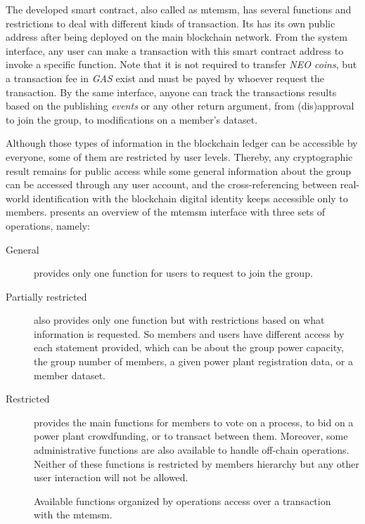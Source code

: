 The developed smart contract, also called as \gls{mtemsm}, has several functions and restrictions to deal with different kinds of transaction.
Its has its own public address after being deployed on the main blockchain network.
From the system interface, any user can make a transaction with this smart contract address to invoke a specific function.
Note that it is not required to transfer \emph{NEO coins}, but a transaction fee in \emph{GAS} exist and must be payed by whoever request the transaction.
By the same interface, anyone can track the transactions results based on the publishing \emph{events} or any other return argument, from (dis)approval to join the group, to modifications on a member's dataset.

Although those types of information in the blockchain ledger can be accessible by everyone, some of them are restricted by user levels.
Thereby, any cryptographic result remains for public access while some general information about the group can be accessed through any user account, and the cross-referencing between real-world identification with the blockchain digital identity keeps accessible only to members.
 presents an overview of the \gls{mtemsm} interface with three sets of operations, namely:
\begin{description} %
    \item[General] provides only one function for users to request to join the group.
    
    \item[Partially restricted] also provides only one function but with restrictions based on what information is requested. So members and users have different access by each statement provided, which can be about the group power capacity, the group number of members, a given power plant registration data, or a member dataset.
    
    \item[Restricted] provides the main functions for members to vote on a process, to bid on a power plant crowdfunding, or to transact between them. Moreover, some administrative functions are also available to handle off-chain operations. Neither of these functions is restricted by members hierarchy but any other user interaction will not be allowed.
\end{description}

\begin{figure}[h!tbp]{\textwidth}
    \centering
    \caption{Available functions organized by operations access over a transaction with the \gls{mtemsm}.}
    \label{fig:flow-mtemsm}
    \frame{\resizebox{\textwidth}{!}{}}
    \source{\copyright}
\end{figure}

